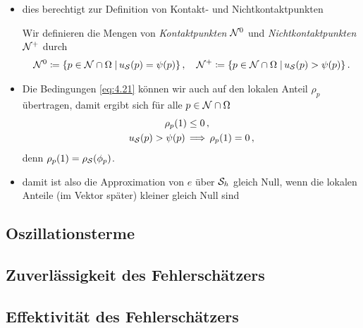 \begin{itemize}
\item dies berechtigt zur Definition von Kontakt- und Nichtkontaktpunkten
\begin{defi}
Wir definieren die Mengen von \textit{Kontaktpunkten} $\mathcal N^0$ und \textit{Nichtkontaktpunkten} $\mathcal N^+$ durch
\begin{align*}
	\mathcal N^0 \coloneqq  \{p \in \mathcal N \cap \Omega \;\vert\, u_{\mathcal S}(p) = \psi (p) \} \, , \quad 
	\mathcal N^+ \coloneqq  \{p \in \mathcal N \cap \Omega \;\vert\, u_{\mathcal S}(p) > \psi (p) \}\, .
\end{align*}
\end{defi}

\item 
\begin{bem}
Die Bedingungen \eqref{eq:4.21} können wir auch auf den lokalen Anteil $\rho_p$ übertragen, damit ergibt sich für alle $p \in \mathcal N \cap \Omega$
\begin{subequations}\label{eq:4.22}
\begin{align}\label{eq:4.22a}
	\rho_p(1) &  \le 0\, ,  \\
	\label{eq:4.22b}
	u_{\mathcal S} (p) > \psi (p) \, & \Longrightarrow \, \rho_p(1) =0 \, ,
\end{align}
\end{subequations}
denn $\rho_p (1) = \rho_{\mathcal S} (\phi_p)$.
\end{bem}

\item damit ist also die Approximation von $e$ über $\mathcal S_h$ gleich Null, wenn die lokalen Anteile (im Vektor später) kleiner gleich Null sind

\end{itemize}






\subsection{Oszillationsterme}
\label{kap:4.1.3}



\subsection{Zuverlässigkeit des Fehlerschätzers}
\label{kap:4.1.4}



\subsection{Effektivität des Fehlerschätzers}
\label{kap:4.1.5}



